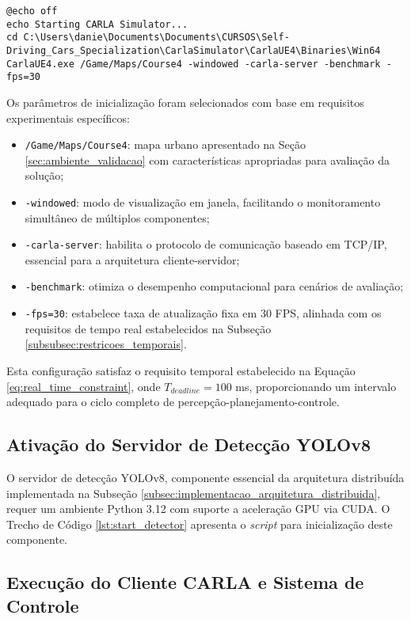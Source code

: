 \begin{lstlisting}[style=cmdstyle, caption={Inicialização do simulador CARLA.}, label={lst:start_carla}]
@echo off
echo Starting CARLA Simulator...
cd C:\Users\danie\Documents\Documents\CURSOS\Self-Driving_Cars_Specialization\CarlaSimulator\CarlaUE4\Binaries\Win64
CarlaUE4.exe /Game/Maps/Course4 -windowed -carla-server -benchmark -fps=30
\end{lstlisting}

Os parâmetros de inicialização foram selecionados com base em requisitos experimentais específicos:

\begin{itemize}
    \item \texttt{/Game/Maps/Course4}: mapa urbano apresentado na Seção \ref{sec:ambiente_validacao} com características apropriadas para avaliação da solução;
    \item \texttt{-windowed}: modo de visualização em janela, facilitando o monitoramento simultâneo de múltiplos componentes;
    \item \texttt{-carla-server}: habilita o protocolo de comunicação baseado em TCP/IP, essencial para a arquitetura cliente-servidor;
    \item \texttt{-benchmark}: otimiza o desempenho computacional para cenários de avaliação;
    \item \texttt{-fps=30}: estabelece taxa de atualização fixa em 30 FPS, alinhada com os requisitos de tempo real estabelecidos na Subseção \ref{subsubsec:restricoes_temporais}.
\end{itemize}

Esta configuração satisfaz o requisito temporal estabelecido na Equação \ref{eq:real_time_constraint}, onde $T_{deadline} = 100$ ms, proporcionando um intervalo adequado para o ciclo completo de percepção-planejamento-controle.

\subsection{Ativação do Servidor de Detecção YOLOv8}

O servidor de detecção YOLOv8, componente essencial da arquitetura distribuída implementada na Subseção \ref{subsec:implementacao_arquitetura_distribuida}, requer um ambiente Python 3.12 com suporte a aceleração GPU via CUDA. O Trecho de Código \ref{lst:start_detector} apresenta o \textit{script} para inicialização deste componente.

\subsection{Execução do Cliente CARLA e Sistema de Controle}

